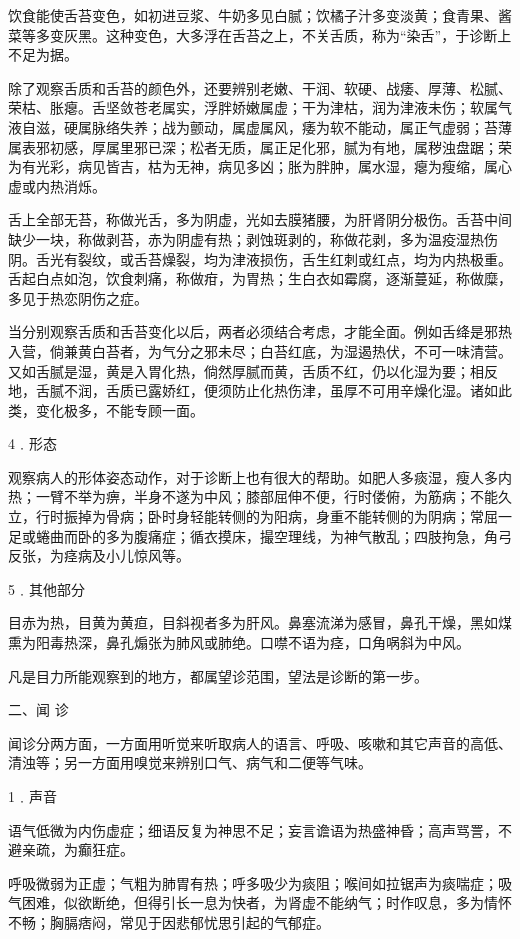 \documentclass[a4paper,12pt,UTF8,twoside]{ctexbook}
\begin{document}
饮食能使舌苔变色，如初进豆浆、牛奶多见白腻；饮橘子汁多变淡黄；食青果、酱菜等多变灰黑。这种变色，大多浮在舌苔之上，不关舌质，称为“染舌”，于诊断上不足为据。

除了观察舌质和舌苔的颜色外，还要辨别老嫩、干润、软硬、战痿、厚薄、松腻、荣枯、胀瘪。舌坚敛苍老属实，浮胖娇嫩属虚；干为津枯，润为津液未伤；软属气液自滋，硬属脉络失养；战为颤动，属虚属风，痿为软不能动，属正气虚弱；苔薄属表邪初感，厚属里邪已深；松者无质，属正足化邪，腻为有地，属秽浊盘踞；荣为有光彩，病见皆吉，枯为无神，病见多凶；胀为胖肿，属水湿，瘪为瘦缩，属心虚或内热消烁。

舌上全部无苔，称做光舌，多为阴虚，光如去膜猪腰，为肝肾阴分极伤。舌苔中间缺少一块，称做剥苔，赤为阴虚有热；剥蚀斑剥的，称做花剥，多为温疫湿热伤阴。舌光有裂纹，或舌苔燥裂，均为津液损伤，舌生红刺或红点，均为内热极重。舌起白点如泡，饮食刺痛，称做疳，为胃热；生白衣如霉腐，逐渐蔓延，称做糜，多见于热恋阴伤之症。

当分别观察舌质和舌苔变化以后，两者必须结合考虑，才能全面。例如舌绛是邪热入营，倘兼黄白苔者，为气分之邪未尽；白苔红底，为湿遏热伏，不可一味清营。又如舌腻是湿，黄是入胃化热，倘然厚腻而黄，舌质不红，仍以化湿为要；相反地，舌腻不润，舌质已露娇红，便须防止化热伤津，虽厚不可用辛燥化湿。诸如此类，变化极多，不能专顾一面。

4﹒形态

观察病人的形体姿态动作，对于诊断上也有很大的帮助。如肥人多痰湿，瘦人多内热；一臂不举为痹，半身不遂为中风；膝部屈伸不便，行时偻俯，为筋病；不能久立，行时振掉为骨病；卧时身轻能转侧的为阳病，身重不能转侧的为阴病；常屈一足或蜷曲而卧的多为腹痛症；循衣摸床，撮空理线，为神气散乱；四肢拘急，角弓反张，为痉病及小儿惊风等。

5﹒其他部分

目赤为热，目黄为黄疸，目斜视者多为肝风。鼻塞流涕为感冒，鼻孔干燥，黑如煤熏为阳毒热深，鼻孔煽张为肺风或肺绝。口噤不语为痉，口角㖞斜为中风。

凡是目力所能观察到的地方，都属望诊范围，望法是诊断的第一步。

二、闻 诊

闻诊分两方面，一方面用听觉来听取病人的语言、呼吸、咳嗽和其它声音的高低、清浊等；另一方面用嗅觉来辨别口气、病气和二便等气味。

1﹒声音

语气低微为内伤虚症；细语反复为神思不足；妄言谵语为热盛神昏；高声骂詈，不避亲疏，为癫狂症。

呼吸微弱为正虚；气粗为肺胃有热；呼多吸少为痰阻；喉间如拉锯声为痰喘症；吸气困难，似欲断绝，但得引长一息为快者，为肾虚不能纳气；时作叹息，多为情怀不畅；胸膈痞闷，常见于因悲郁忧思引起的气郁症。
\end{document}
